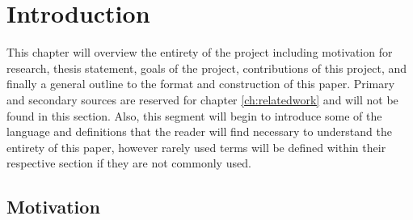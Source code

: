 %
%

\chapter{Introduction}\label{ch:intro} %


This chapter will overview the entirety of the project including motivation for research, thesis statement, goals of the project, contributions of this project, and finally a general outline to the format and construction of this paper.  Primary and secondary sources are reserved for chapter \ref{ch:relatedwork} and will not be found in this section.  Also, this segment will begin to introduce some of the language and definitions that the reader will find necessary to understand the entirety of this paper, however rarely used terms will be defined within their respective section if they are not commonly used.  


\section{Motivation} \label{sec:motivation}

